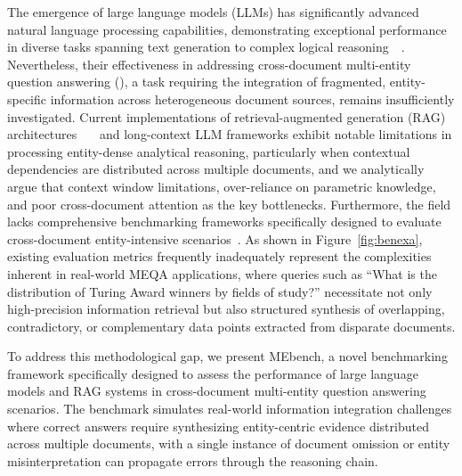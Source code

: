 The emergence of large language models (LLMs) has significantly advanced natural language processing capabilities, demonstrating exceptional performance in diverse tasks spanning text generation to complex logical reasoning~\citep{achiam2023gpt}~\citep{Llama3_2024}. Nevertheless, their effectiveness in addressing cross-document multi-entity question answering (\meqa), a task requiring the integration of fragmented, entity-specific information across heterogeneous document sources, remains insufficiently investigated. Current implementations of retrieval-augmented generation (RAG) architectures~\citep{wu2025clash}~\citep{fan2024Asurvey}~\citep{Tang2024graphgpt} and long-context LLM frameworks exhibit notable limitations in processing entity-dense analytical reasoning, particularly when contextual dependencies are distributed across multiple documents, and we analytically argue that context window limitations, over-reliance on parametric knowledge, and poor cross-document attention as the key bottlenecks. Furthermore, the field lacks comprehensive benchmarking frameworks specifically designed to evaluate cross-document entity-intensive scenarios~\citep{song2024counting}. As shown in Figure~\ref{fig:benexa}, existing evaluation metrics frequently inadequately represent the complexities inherent in real-world MEQA applications, where queries such as ``What is the distribution of Turing Award winners by fields of study?'' necessitate not only high-precision information retrieval but also structured synthesis of overlapping, contradictory, or complementary data points extracted from disparate documents.  

To address this methodological gap, we present MEbench, a novel benchmarking framework specifically designed to assess the performance of large language models and RAG systems in cross-document multi-entity question answering scenarios. The benchmark simulates real-world information integration challenges where correct answers require synthesizing entity-centric evidence distributed across multiple documents, with a single instance of document omission or entity misinterpretation can propagate errors through the reasoning chain.


